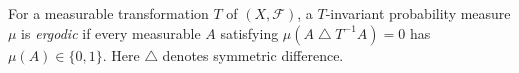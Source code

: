 
For a measurable transformation $T$ of $(X,\mathcal F)$, a $T$-invariant probability measure $\mu$ is \emph{ergodic} if every measurable $A$ satisfying $\mu(A\mathbin\triangle T^{-1}A)=0$ has $\mu(A)\in\{0,1\}$. Here $\triangle$ denotes symmetric difference.

